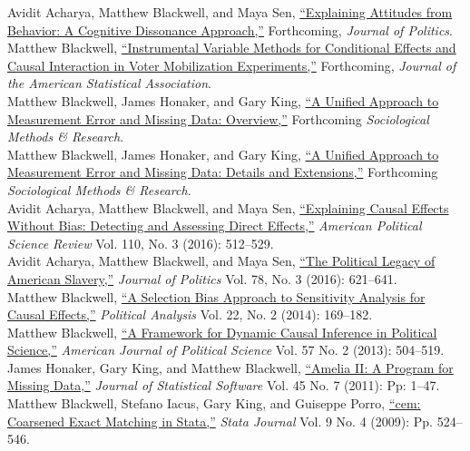 \documentclass[margin,line,12pt]{res}
\begin{document}
\begin{resume}
Avidit Acharya, Matthew Blackwell, and Maya Sen, \href{http://www.mattblackwell.org/files/papers/attitudes.pdf}{``Explaining Attitudes from Behavior: A Cognitive Dissonance Approach,''} Forthcoming, \emph{Journal of Politics}.\vspace{1em}\\
Matthew Blackwell, \href{http://www.mattblackwell.org/files/papers/joint-iv.pdf}{``Instrumental Variable Methods for Conditional Effects and Causal Interaction in Voter Mobilization Experiments,''} Forthcoming, \emph{Journal of the American Statistical Association}.\vspace{1em}\\
Matthew Blackwell, James Honaker, and Gary King, \href{http://gking.harvard.edu/files/measure.pdf}{``A Unified Approach to Measurement Error and
Missing Data: Overview,''} Forthcoming \emph{Sociological Methods \& Research}.\vspace{1em}\\
Matthew Blackwell, James Honaker, and Gary King, \href{http://gking.harvard.edu/files/measured.pdf}{``A Unified Approach to Measurement Error and
  Missing Data: Details and Extensions,''} Forthcoming \emph{Sociological Methods \& Research}.\vspace{1em}\\
Avidit Acharya, Matthew Blackwell, and Maya Sen, \href{http://www.mattblackwell.org/files/papers/direct-effects.pdf}{``Explaining Causal Effects Without Bias: Detecting and Assessing Direct Effects,''} \emph{American Political Science Review } Vol. 110, No. 3 (2016): 512--529.\vspace{1em}\\
Avidit Acharya, Matthew Blackwell, and Maya Sen, \href{http://www.mattblackwell.org/files/papers/slavery.pdf}{``The Political Legacy of American Slavery,''}   \emph{Journal of Politics }Vol. 78, No. 3 (2016): 621--641.\vspace{1em}\\
Matthew Blackwell, \href{http://gking.harvard.edu/files/sens.pdf}{``A Selection Bias Approach to Sensitivity
Analysis for Causal Effects,''} \emph{Political Analysis} Vol. 22, No. 2 (2014): 169--182.\vspace{1em}\\
Matthew Blackwell,
\href{http://mattblackwell.org/files/papers/dynci.pdf}{``A Framework
  for Dynamic Causal Inference in Political Science,''}
\emph{American Journal of Political Science} Vol. 57 No. 2 (2013): 504--519.\vspace{1em}\\
James Honaker, Gary King, and Matthew Blackwell, \href{http://www.mattblackwell.org/files/papers/amelia-jss.pdf}{``Amelia II: A
Program for Missing Data,''} \emph{Journal of Statistical Software}
Vol. 45 No. 7 (2011): Pp: 1--47.
\vspace{1em}\\
Matthew Blackwell, Stefano Iacus, Gary King, and Guiseppe Porro, \href{http://www.mattblackwell.org/files/papers/cemStata.pdf}{``cem: Coarsened Exact Matching in Stata,''} \emph{Stata
  Journal} Vol. 9 No. 4 (2009): Pp. 524--546.



\end{resume}
\end{document}
